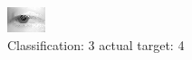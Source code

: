\begin{figure}[h!]
\begin{center}
\includegraphics[width=0.60\columnwidth]{figures/ID2586_class_3_target_4.png}
\end{center}
\caption{ Classification: 3 actual target: 4}
\label{fig:ID2586_class_3_target_4}
\end{figure}
